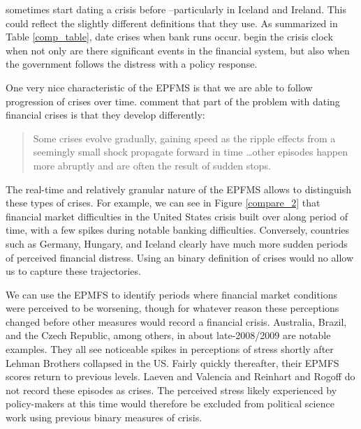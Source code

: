 \documentclass[]{article}
\begin{document}
\cite{Reinhart2009} sometimes start dating a crisis before \cite{laeven2013}--particularly in Iceland and Ireland. This could reflect the slightly different definitions that they use. As summarized in Table \ref{comp_table}, \cite{Reinhart2009} date crises when bank runs occur. \cite{laeven2013} begin the crisis clock when not only are there significant events in the financial system, but also when the government follows the distress with a policy response.

One very nice characteristic of the EPFMS is that we are able to follow
progression of crises over time. \cite[227]{laeven2013} comment
that part of the problem with dating financial crises is that they
develop differently:

\begin{quote}
    Some crises evolve gradually, gaining speed as the ripple effects from a seemingly small shock propagate forward in time \ldots other episodes happen more abruptly and are often the result of sudden stops.
\end{quote}

The real-time and relatively granular nature of the EPFMS allows to
distinguish these types of crises. For example, we can see in Figure
\ref{compare_2} that financial market difficulties in the United States
crisis built over along period of time, with a few spikes during notable
banking difficulties. Conversely, countries such as Germany, Hungary,
and Iceland clearly have much more sudden periods of perceived financial
distress. Using an binary definition of crises would no allow us to
capture these trajectories.

We can use the EPMFS to identify periods where financial market
conditions were perceived to be worsening, though for whatever reason
these perceptions changed before other measures would record a financial
crisis. Australia, Brazil, and the Czech Republic, among others, in
about late-2008/2009 are notable examples. They all see noticeable
spikes in perceptions of stress shortly after Lehman Brothers collapsed
in the US. Fairly quickly thereafter, their EPMFS scores return to
previous levels. Laeven and Valencia and Reinhart and Rogoff do not
record these episodes as crises. The perceived stress likely experienced
by policy-makers at this time would therefore be excluded from political
science work using previous binary measures of crisis.
\end{document}
